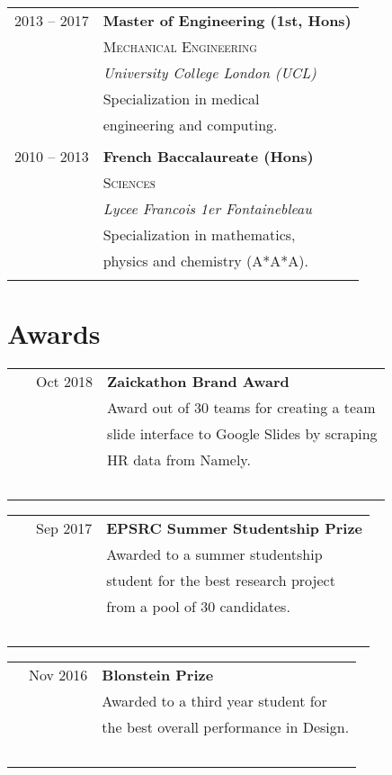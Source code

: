 \documentclass[10pt]{article}
\begin{document}
{{\begin{minipage}[t]{0.44\textwidth}
\begin{tabular}{rl}

2013 -- 2017 & \textbf{Master of Engineering (1st, Hons)}\\
& \textsc{Mechanical Engineering}\\
& \textit{University College London (UCL)}\\
& \normalsize{Specialization in medical}\\
& \normalsize{engineering and computing.}\\
\\

2010 -- 2013 & \textbf{French Baccalaureate (Hons)}\\
& \textsc{Sciences}\\
& \textit{Lycee Francois 1er Fontainebleau}\\
& \normalsize{Specialization in mathematics,}\\
& \normalsize{physics and chemistry (A*A*A).}\\
\\

\end{tabular}

\section{Awards}

\begin{tabular}{rl}
~~~Oct 2018 & \textbf{Zaickathon Brand Award}\\
& Award out of 30 teams for creating a team\\
& slide interface to Google Slides by scraping\\
& HR data from Namely.\\ \
\end{tabular}

\begin{tabular}{rl}
~~~Sep 2017 & \textbf{EPSRC Summer Studentship Prize}\\
& Awarded to a summer studentship\\
& student for the best research project\\
& from a pool of 30 candidates.\\ \
\end{tabular}

\begin{tabular}{rl}
~~Nov 2016 & \textbf{Blonstein Prize}\\
& Awarded to a third year student for\\
& the best overall performance in Design.\\ \
\end{tabular}


\end{minipage}}}
\end{document}
